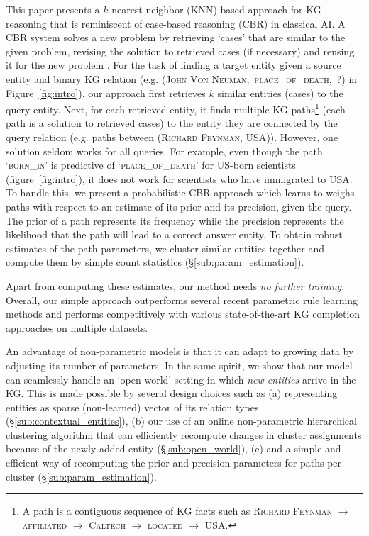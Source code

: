 \documentclass[11pt,a4paper]{article}
\begin{document}
This paper presents a $k$-nearest neighbor (KNN) based approach for KG reasoning that is reminiscent of case-based reasoning (CBR) in classical AI. A CBR system solves a new problem by retrieving `cases' that are similar to the given problem, revising the solution to retrieved cases (if necessary) and reusing it for the new problem \citep[inter-alia]{schank1982dynamic,leake1996cbr}. For the task of finding a target entity given a source entity and binary KG relation (e.g. (\textsc{John Von Neuman},~\textsc{place\_of\_death},~?) in Figure~\ref{fig:intro}), our approach first retrieves $k$ similar entities (cases) to the query entity. Next, for each retrieved entity, it finds multiple KG paths\footnote{A path is a contiguous sequence of KG facts such as  \textsc{Richard Feynman} $\to$ \textsc{affiliated} $\to$ \textsc{Caltech} $\to$ \textsc{located} $\to$ \textsc{USA}.} (each path is a solution to retrieved cases) to the entity they are connected by the query relation (e.g. paths between (\textsc{Richard Feynman, USA})). However, one solution seldom works for all queries. For example, even though the path `\textsc{born\_in}' is predictive of `\textsc{place\_of\_death}' for US-born scientists (figure~\ref{fig:intro}), it does not work for scientists who have immigrated to USA. To handle this, we present a probabilistic CBR approach which learns to weighs paths with respect to an estimate of its prior and its precision, given the query. The prior of a path represents its frequency while the precision represents the likelihood that the path will lead to a correct answer entity. To obtain robust estimates of the path parameters, we cluster similar entities together and compute them by simple count statistics (\S\ref{sub:param_estimation}).


Apart from computing these estimates, our method needs \emph{no further training}. Overall, our simple approach outperforms several recent parametric rule learning methods \cite{das2018go,minervini2019differentiable} and performs competitively with various state-of-the-art KG completion approaches \cite{dettmers2018convolutional} on multiple datasets. 

An advantage of non-parametric models is that it can adapt to growing data by adjusting its number of parameters. In the same spirit, we show that our model can seamlessly handle an `open-world' setting in which \emph{new entities} arrive in the KG. This is made possible by several design choices such as (a) representing entities as sparse (non-learned) vector of its relation types (\S\ref{sub:contextual_entities}), (b) our use of an online non-parametric hierarchical clustering algorithm  \cite{monath2019scalable} that can efficiently recompute changes in cluster assignments because of the newly added entity (\S\ref{sub:open_world}), (c) and a simple and efficient way of recomputing the prior and precision parameters for paths per cluster (\S\ref{sub:param_estimation}).
\end{document}
